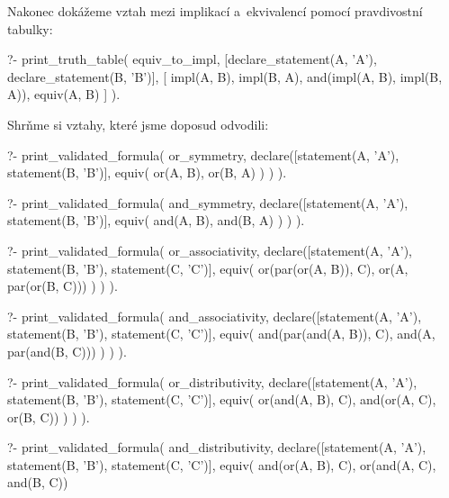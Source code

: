 Nakonec dokážeme vztah mezi implikací a~ekvivalencí pomocí pravdivostní tabulky:


\begin{prolog}
?- print_truth_table(
	equiv_to_impl,
	[declare_statement(A, 'A'), declare_statement(B, 'B')],
	[
		impl(A, B),
		impl(B, A),
		and(impl(A, B), impl(B, A)),
		equiv(A, B)
	]
).
\end{prolog}

Shrňme si vztahy, které jsme doposud odvodili:

\begin{fact}
\begin{prolog}
?- print_validated_formula(
	or_symmetry,
	declare([statement(A, 'A'), statement(B, 'B')],
		equiv(
			or(A, B),
			or(B, A)
		)
	)
).
\end{prolog}
\begin{prolog}
?- print_validated_formula(
	and_symmetry,
	declare([statement(A, 'A'), statement(B, 'B')],
		equiv(
			and(A, B),
			and(B, A)
		)
	)
).
\end{prolog}
\begin{prolog}
?- print_validated_formula(
	or_associativity,
	declare([statement(A, 'A'), statement(B, 'B'), statement(C, 'C')],
		equiv(
			or(par(or(A, B)), C),
			or(A, par(or(B, C)))
		)
	)
).
\end{prolog}
\begin{prolog}
?- print_validated_formula(
	and_associativity,
	declare([statement(A, 'A'), statement(B, 'B'), statement(C, 'C')],
		equiv(
			and(par(and(A, B)), C),
			and(A, par(and(B, C)))
		)
	)
).
\end{prolog}
\begin{prolog}
?- print_validated_formula(
	or_distributivity,
	declare([statement(A, 'A'), statement(B, 'B'), statement(C, 'C')],
		equiv(
			or(and(A, B), C),
			and(or(A, C), or(B, C))
		)
	)
).
\end{prolog}
\begin{prolog}
?- print_validated_formula(
	and_distributivity,
	declare([statement(A, 'A'), statement(B, 'B'), statement(C, 'C')],
		equiv(
			and(or(A, B), C),
			or(and(A, C), and(B, C))

\end{prolog}
\end{fact}
